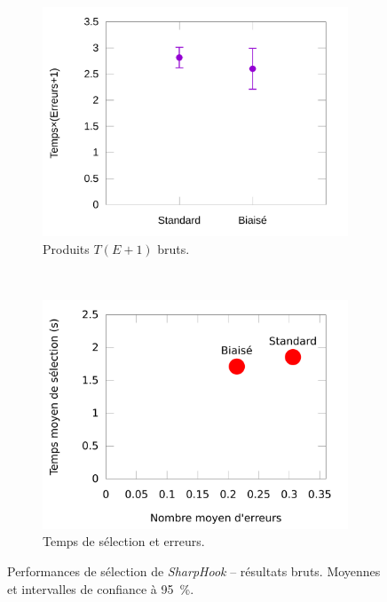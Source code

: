 \begin{figure}[htbp]
\begin{subfigure}[t]{0.49\textwidth}
			\includegraphics[width=\textwidth]{figures/ch5/hookRawProducts}
			\caption{Produits $T(E+1)$ bruts.}
			\label{fig:hookRawProducts}
		\end{subfigure}
		~
		\begin{subfigure}[t]{0.49\textwidth}
			\centering
			\includegraphics[width=\textwidth]{figures/ch5/rawHookErrorsTimesScatter}
			\caption{Temps de sélection et erreurs.}
			\label{fig:rawHookErrorsTimesScatter}
		\end{subfigure}
		\caption[\emph{SharpHook} -- résultats bruts]{Performances de sélection de \emph{SharpHook} -- résultats bruts. Moyennes et intervalles de confiance à 95~\%{}.}
		\label{fig:rawHookPerfs}
	\end{figure}
	
